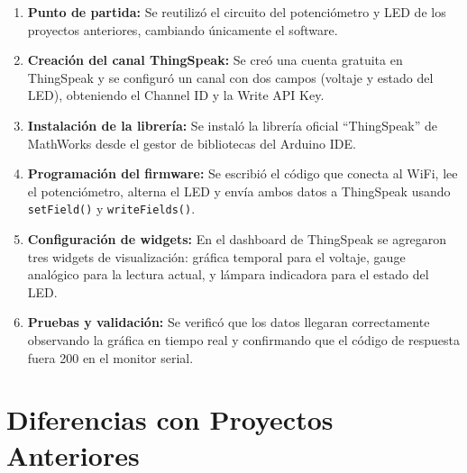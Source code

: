 \documentclass[12pt,a4paper]{article}
\begin{document}
\begin{enumerate}
    \item \textbf{Punto de partida:} Se reutilizó el circuito del potenciómetro y LED de los proyectos anteriores, cambiando únicamente el software.
    
    \item \textbf{Creación del canal ThingSpeak:} Se creó una cuenta gratuita en ThingSpeak y se configuró un canal con dos campos (voltaje y estado del LED), obteniendo el Channel ID y la Write API Key.
    
    \item \textbf{Instalación de la librería:} Se instaló la librería oficial ``ThingSpeak'' de MathWorks desde el gestor de bibliotecas del Arduino IDE.
    
    \item \textbf{Programación del firmware:} Se escribió el código que conecta al WiFi, lee el potenciómetro, alterna el LED y envía ambos datos a ThingSpeak usando \texttt{setField()} y \texttt{writeFields()}.
    
    \item \textbf{Configuración de widgets:} En el dashboard de ThingSpeak se agregaron tres widgets de visualización: gráfica temporal para el voltaje, gauge analógico para la lectura actual, y lámpara indicadora para el estado del LED.
    
    \item \textbf{Pruebas y validación:} Se verificó que los datos llegaran correctamente observando la gráfica en tiempo real y confirmando que el código de respuesta fuera 200 en el monitor serial.
\end{enumerate}

\section{Diferencias con Proyectos Anteriores}
\end{document}
